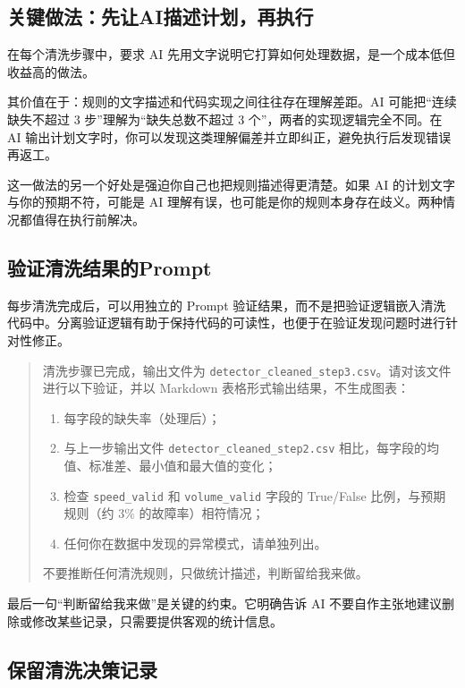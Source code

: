 \subsection{关键做法：先让AI描述计划，再执行}
\label{sec:ch05_plan_first}

在每个清洗步骤中，要求 AI 先用文字说明它打算如何处理数据，是一个成本低但收益高的做法。

其价值在于：规则的文字描述和代码实现之间往往存在理解差距。AI 可能把“连续缺失不超过 3 步”理解为“缺失总数不超过 3 个”，两者的实现逻辑完全不同。在 AI 输出计划文字时，你可以发现这类理解偏差并立即纠正，避免执行后发现错误再返工。

这一做法的另一个好处是强迫你自己也把规则描述得更清楚。如果 AI 的计划文字与你的预期不符，可能是 AI 理解有误，也可能是你的规则本身存在歧义。两种情况都值得在执行前解决。

\subsection{验证清洗结果的Prompt}

每步清洗完成后，可以用独立的 Prompt 验证结果，而不是把验证逻辑嵌入清洗代码中。分离验证逻辑有助于保持代码的可读性，也便于在验证发现问题时进行针对性修正。

\begin{quote}
清洗步骤已完成，输出文件为 \texttt{detector\_cleaned\_step3.csv}。请对该文件进行以下验证，并以 Markdown 表格形式输出结果，不生成图表：

\begin{enumerate}
  \item 每字段的缺失率（处理后）；
  \item 与上一步输出文件 \texttt{detector\_cleaned\_step2.csv} 相比，每字段的均值、标准差、最小值和最大值的变化；
  \item 检查 \texttt{speed\_valid} 和 \texttt{volume\_valid} 字段的 True/False 比例，与预期规则（约 3\% 的故障率）相符情况；
  \item 任何你在数据中发现的异常模式，请单独列出。
\end{enumerate}

不要推断任何清洗规则，只做统计描述，判断留给我来做。
\end{quote}

最后一句“判断留给我来做”是关键的约束。它明确告诉 AI 不要自作主张地建议删除或修改某些记录，只需要提供客观的统计信息。

\subsection{保留清洗决策记录}

